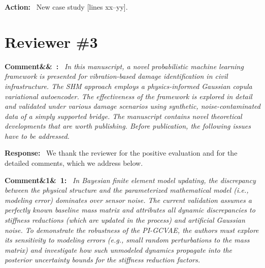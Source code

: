 \documentclass[11pt]{article}
\newenvironment{rcomment}[1]{\par\bigskip\noindent\textbf{Comment\ifx&#1&\else\ #1\fi:}\ \itshape}{\par}
\newenvironment{response}{\par\smallskip\noindent\color{resp}\textbf{Response:}\ }{\par}
\newenvironment{action}{\par\smallskip\noindent\color{resp}\textbf{Action:}\ }{\par}
\newcommand{\tbd}[1]{\textcolor{note}{\textsf{[#1]}}}
\newcommand{\lines}[1]{\tbd{lines #1}}
\begin{document}
\begin{action}
New case study \lines{xx--yy}.
\end{action}

\section{Reviewer \#3}

\begin{rcomment}{}
In this manuscript, a novel probabilistic machine learning framework is presented for vibration-based damage
identification in civil infrastructure. The SHM approach employs a physics-informed Gaussian copula variational
autoencoder. The effectiveness of the framework is explored in detail and validated under various damage scenarios
using synthetic, noise-contaminated data of a simply supported bridge. The manuscript contains novel theoretical
developments that are worth publishing. Before publication, the following issues have to be addressed.
\end{rcomment}

\begin{response}
We thank the reviewer for the positive evaluation and for the detailed comments, which we address below.
\end{response}

\begin{rcomment}{1}
In Bayesian finite element model updating, the discrepancy between the physical structure and the parameterized
mathematical model (i.e., modeling error) dominates over sensor noise. The current validation assumes a perfectly known
baseline mass matrix and attributes all dynamic discrepancies to stiffness reductions (which are updated in the process)
and artificial Gaussian noise. To demonstrate the robustness of the PI-GCVAE, the authors must explore its sensitivity
to modeling errors (e.g., small random perturbations to the mass matrix) and investigate how such unmodeled dynamics
propagate into the posterior uncertainty bounds for the stiffness reduction factors.
\end{rcomment}
\end{document}
